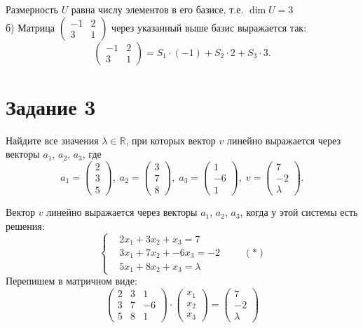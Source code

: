 \documentclass[a4paper,12pt]{article}
\begin{document}
Размерность $U$ равна числу элементов в его базисе, т.е. $\dim U=3$ \\
б)  Матрица $\left(\begin{smallmatrix}
-1 & 2 \\
3 & 1
\end{smallmatrix} \right)$ через указанный выше базис выражается так:
$$\begin{pmatrix}
-1 & 2 \\
3 & 1
\end{pmatrix}=S_1 \cdot (-1) + S_2 \cdot 2 + S_3 \cdot 3.$$

\section*{Задание 3}
Найдите все значения $\lambda\in \mathbb R$, при которых вектор $v$ линейно выражается через векторы $a_1$, $a_2$, $a_3$, где
$$a_1 = 
\begin{pmatrix}
{2}\\{3}\\{5}
\end{pmatrix},\;
a_2 = 
\begin{pmatrix}
{3}\\{7}\\{8}
\end{pmatrix},\;
a_3 = 
\begin{pmatrix}
{1}\\{-6}\\{1}
\end{pmatrix},\;
v = 
\begin{pmatrix}
{7}\\{-2}\\{\lambda}
\end{pmatrix}.$$
\par
Вектор $v$ линейно выражается через векторы $a_1$, $a_2$, $a_3$, когда у этой системы есть решения:
$$
\left\{
\begin{aligned}
&2x_1 + 3x_2 + x_3 = 7\\
&3x_1 + 7x_2 + -6x_3 = -2\\
&5x_1 + 8x_2 + x_3 = \lambda
\end{aligned}
\right.
\qquad (*)$$
Перепишем в матричном виде:
$$\begin{pmatrix}
2 & 3 & 1\\
3 & 7 & -6\\
5 & 8& 1
\end{pmatrix} \cdot
\begin{pmatrix}
{x_1}\\{x_2}\\{x_3}
\end{pmatrix}
 = 
\begin{pmatrix}
{7}\\{-2}\\{\lambda}
\end{pmatrix}
$$
\end{document}
